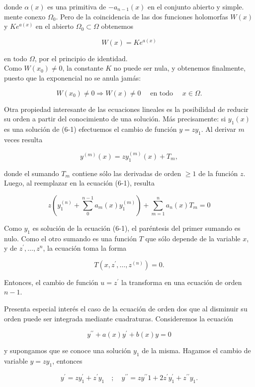 \documentclass[10pt]{article}
\theoremstyle{plain}
\theoremstyle{definition}
\theoremstyle{remark}
\begin{document}
donde $\alpha(x)$ es una primitiva de $-a_{n-1}(x)$ en el conjunto abierto y simple. mente conexo $\Omega_{0}$. Pero de la coincidencia de las dos funciones holomorfas $W(x)$ y $K e^{a(x)}$ en el abierto $\Omega_{0} \subset \Omega$ obtenemos

$$
W(x)=K e^{a(x)}
$$

en todo $\Omega$, por el principio de identidad.\\
Como $W\left(x_{0}\right) \neq 0$, la constante $K$ no puede ser nula, y obtenemos finalmente, puesto que la exponencial no se anula jamás:

$$
W\left(x_{0}\right) \neq 0 \Rightarrow W(x) \neq 0 \quad \text { en todo } \quad x \in \Omega .
$$

Otra propiedad interesante de las ecuaciones lineales es la posibilidad de reducir su orden a partir del conocimiento de una solución. Más precisamente: si $y_{1}(x)$ es una solución de (6-1) efectuemos el cambio de función $y=z y_{1}$. Al derivar $m$ veces resulta

$$
y^{(m)}(x)=z y_{1}^{(m)}(x)+T_{m},
$$

donde el sumando $T_{m}$ contiene sólo las derivadas de orden $\geqslant 1$ de la función $z$. Luego, al reemplazar en la ecuación (6-1), resulta

$$
z\left(y_{1}^{(n)}+\sum_{0}^{n-1} a_{m}(x) y_{1}^{(m)}\right)+\sum_{m=1}^{n} a_{n}(x) T_{m}=0
$$

Como $y_{1}$ es solución de la ecuación (6-1), el paréntesis del primer sumando es nulo. Como el otro sumando es una función $T$ que sólo depende de la variable $x$, y de $z^{\prime}, \ldots, z^{n}$, la ecuación toma la forma

$$
T\left(x, z^{\prime}, \ldots, z^{(n)}\right)=0 .
$$

Entonces, el cambio de función $u=z^{\prime}$ la transforma en una ecuación de orden $n-1$.

Presenta especial interés el caso de la ecuación de orden dos que al disminuir su orden puede ser integrada mediante cuadraturas. Consideremos la ecuación


\begin{equation*}
y^{\prime \prime}+a(x) y^{\prime}+b(x) y=0 \tag{$6\cdot7$}
\end{equation*}


y supongamos que se conoce una solución $y_{1}$ de la misma. Hagamos el cambio de variable $y=z y_{1}$, entonces

$$
y^{\prime}=z y_{1}^{\prime}+z^{\prime} y_{1} \quad ; \quad y^{\prime \prime}=z y^{\prime \prime} 1+2 z^{\prime} y_{1}^{\prime}+z^{\prime \prime} y_{1} .
$$
\end{document}
